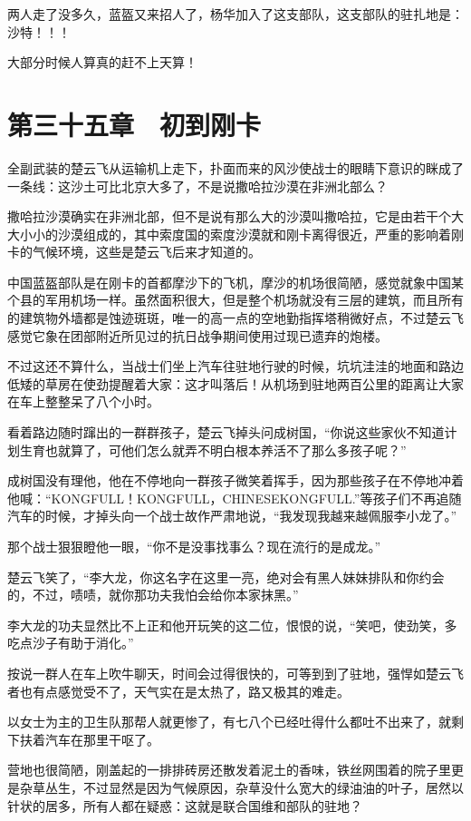 两人走了没多久，蓝盔又来招人了，杨华加入了这支部队，这支部队的驻扎地是：沙特！！！

大部分时候人算真的赶不上天算！

\section{第三十五章　初到刚卡}

全副武装的楚云飞从运输机上走下，扑面而来的风沙使战士的眼睛下意识的眯成了一条线：这沙土可比北京大多了，不是说撒哈拉沙漠在非洲北部么？

撒哈拉沙漠确实在非洲北部，但不是说有那么大的沙漠叫撒哈拉，它是由若干个大大小小的沙漠组成的，其中索度国的索度沙漠就和刚卡离得很近，严重的影响着刚卡的气候环境，这些是楚云飞后来才知道的。

中国蓝盔部队是在刚卡的首都摩沙下的飞机，摩沙的机场很简陋，感觉就象中国某个县的军用机场一样。虽然面积很大，但是整个机场就没有三层的建筑，而且所有的建筑物外墙都是蚀迹斑斑，唯一的高一点的空地勤指挥塔稍微好点，不过楚云飞感觉它象在团部附近所见过的抗日战争期间使用过现已遗弃的炮楼。

不过这还不算什么，当战士们坐上汽车往驻地行驶的时候，坑坑洼洼的地面和路边低矮的草房在使劲提醒着大家：这才叫落后！从机场到驻地两百公里的距离让大家在车上整整呆了八个小时。

看着路边随时蹿出的一群群孩子，楚云飞掉头问成树国，“你说这些家伙不知道计划生育也就算了，可他们怎么就弄不明白根本养活不了那么多孩子呢？”

成树国没有理他，他在不停地向一群孩子微笑着挥手，因为那些孩子在不停地冲着他喊：“KONGFULL！KONGFULL，CHINESEKONGFULL.”等孩子们不再追随汽车的时候，才掉头向一个战士故作严肃地说，“我发现我越来越佩服李小龙了。”

那个战士狠狠瞪他一眼，“你不是没事找事么？现在流行的是成龙。”

楚云飞笑了，“李大龙，你这名字在这里一亮，绝对会有黑人妹妹排队和你约会的，不过，啧啧，就你那功夫我怕会给你本家抹黑。”

李大龙的功夫显然比不上正和他开玩笑的这二位，恨恨的说，“笑吧，使劲笑，多吃点沙子有助于消化。”

按说一群人在车上吹牛聊天，时间会过得很快的，可等到到了驻地，强悍如楚云飞者也有点感觉受不了，天气实在是太热了，路又极其的难走。

以女士为主的卫生队那帮人就更惨了，有七八个已经吐得什么都吐不出来了，就剩下扶着汽车在那里干呕了。

营地也很简陋，刚盖起的一排排砖房还散发着泥土的香味，铁丝网围着的院子里更是杂草丛生，不过显然是因为气候原因，杂草没什么宽大的绿油油的叶子，居然以针状的居多，所有人都在疑惑：这就是联合国维和部队的驻地？

